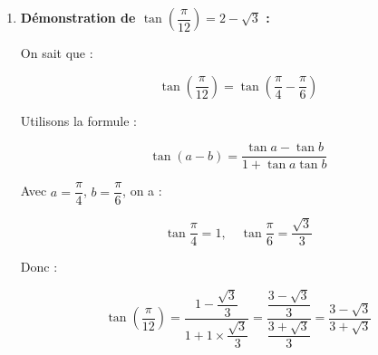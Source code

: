 \documentclass[a4paper,12pt]{article}
\begin{document}
\begin{solutionbox}
\begin{enumerate}
    Sachant que \( \cos^2 \dfrac{\pi}{8} = \dfrac{1 + \cos \dfrac{\pi}{4}}{2} \)

    Or, \( \cos \dfrac{\pi}{4} = \dfrac{\sqrt{2}}{2} \)

    Donc :

    \[
    \cos^2 \dfrac{\pi}{8} = \dfrac{1 + \dfrac{\sqrt{2}}{2}}{2} = \dfrac{2 + \sqrt{2}}{4}
    \]

    Ainsi :

    \[
    \cos \dfrac{\pi}{8} = \sqrt{ \dfrac{2 + \sqrt{2}}{4} } = \dfrac{ \sqrt{2 + \sqrt{2}} }{2 }
    \]

    De même, on peut utiliser \( \sin^2 \dfrac{\pi}{8} = 1 - \cos^2 \dfrac{\pi}{8} \)

    Donc :

    \[
    \sin \dfrac{\pi}{8} = \sqrt{ 1 - \dfrac{2 + \sqrt{2}}{4} } = \sqrt{ \dfrac{2 - \sqrt{2}}{4} } = \dfrac{ \sqrt{2 - \sqrt{2}} }{2 }
    \]

    \textbf{Vérification avec la calculatrice :}

    Calculons numériquement :

    \[
    \cos \dfrac{\pi}{8} \approx \cos 22.5^\circ \approx 0.924
    \]

    Calculons :

    \[
    \dfrac{ \sqrt{2 + \sqrt{2}} }{2 } \approx \dfrac{ \sqrt{2 + 1.414} }{2 } = \dfrac{ \sqrt{3.414} }{2 } \approx \dfrac{1.8478}{2} \approx 0.924
    \]

    Les résultats concordent.

    \item \textbf{Démonstration de \( \tan\left( \dfrac{\pi}{12} \right) = 2 - \sqrt{3} \) :}

    On sait que :

    \[
    \tan \left( \dfrac{\pi}{12} \right) = \tan \left( \dfrac{\pi}{4} - \dfrac{\pi}{6} \right)
    \]

    Utilisons la formule :

    \[
    \tan(a - b) = \dfrac{ \tan a - \tan b }{ 1 + \tan a \tan b }
    \]

    Avec \( a = \dfrac{\pi}{4} \), \( b = \dfrac{\pi}{6} \), on a :

    \[
    \tan \dfrac{\pi}{4} = 1, \quad \tan \dfrac{\pi}{6} = \dfrac{\sqrt{3}}{3}
    \]

    Donc :

    \[
    \tan \left( \dfrac{\pi}{12} \right) = \dfrac{ 1 - \dfrac{\sqrt{3}}{3} }{ 1 + 1 \times \dfrac{\sqrt{3}}{3} } = \dfrac{ \dfrac{3 - \sqrt{3}}{3} }{ \dfrac{3 + \sqrt{3}}{3} } = \dfrac{ 3 - \sqrt{3} }{ 3 + \sqrt{3} }
    \]


\end{enumerate}
\end{solutionbox}
\end{document}
